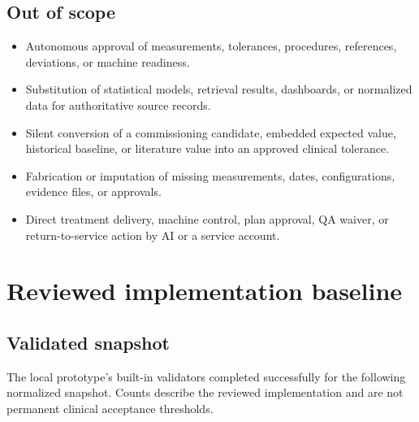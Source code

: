 \documentclass[11pt,letterpaper]{article}
\begin{document}
\subsection{Out of scope}

\begin{itemize}
\item Autonomous approval of measurements, tolerances, procedures, references, deviations, or machine readiness.
\item Substitution of statistical models, retrieval results, dashboards, or normalized data for authoritative source records.
\item Silent conversion of a commissioning candidate, embedded expected value, historical baseline, or literature value into an approved clinical tolerance.
\item Fabrication or imputation of missing measurements, dates, configurations, evidence files, or approvals.
\item Direct treatment delivery, machine control, plan approval, QA waiver, or return-to-service action by AI or a service account.
\end{itemize}

\section{Reviewed implementation baseline}

\subsection{Validated snapshot}

The local prototype's built-in validators completed successfully for the following normalized snapshot. Counts describe the reviewed implementation and are not permanent clinical acceptance thresholds.
\end{document}
